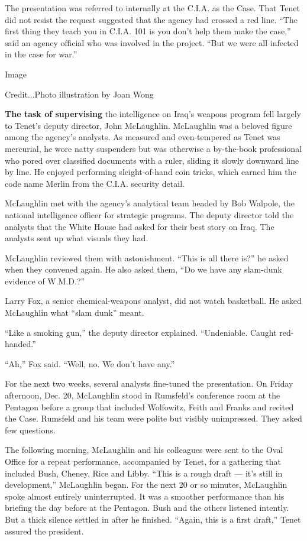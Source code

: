 The presentation was referred to internally at the C.I.A. as the Case.
That Tenet did not resist the request suggested that the agency had
crossed a red line. ``The first thing they teach you in C.I.A. 101 is
you don't help them make the case,'' said an agency official who was
involved in the project. ``But we were all infected in the case for
war.''

Image

Credit...Photo illustration by Joan Wong

\textbf{The task of supervising} the intelligence on Iraq's weapons
program fell largely to Tenet's deputy director, John McLaughlin.
McLaughlin was a beloved figure among the agency's analysts. As measured
and even-tempered as Tenet was mercurial, he wore natty suspenders but
was otherwise a by-the-book professional who pored over classified
documents with a ruler, sliding it slowly downward line by line. He
enjoyed performing sleight-of-hand coin tricks, which earned him the
code name Merlin from the C.I.A. security detail.

McLaughlin met with the agency's analytical team headed by Bob Walpole,
the national intelligence officer for strategic programs. The deputy
director told the analysts that the White House had asked for their best
story on Iraq. The analysts sent up what visuals they had.

McLaughlin reviewed them with astonishment. ``This is all there is?'' he
asked when they convened again. He also asked them, ``Do we have any
slam-dunk evidence of W.M.D.?''

Larry Fox, a senior chemical-weapons analyst, did not watch basketball.
He asked McLaughlin what ``slam dunk'' meant.

``Like a smoking gun,'' the deputy director explained. ``Undeniable.
Caught red-handed.''

``Ah,'' Fox said. ``Well, no. We don't have any.''

For the next two weeks, several analysts fine-tuned the presentation. On
Friday afternoon, Dec. 20, McLaughlin stood in Rumsfeld's conference
room at the Pentagon before a group that included Wolfowitz, Feith and
Franks and recited the Case. Rumsfeld and his team were polite but
visibly unimpressed. They asked few questions.

The following morning, McLaughlin and his colleagues were sent to the
Oval Office for a repeat performance, accompanied by Tenet, for a
gathering that included Bush, Cheney, Rice and Libby. ``This is a rough
draft --- it's still in development,'' McLaughlin began. For the next 20
or so minutes, McLaughlin spoke almost entirely uninterrupted. It was a
smoother performance than his briefing the day before at the Pentagon.
Bush and the others listened intently. But a thick silence settled in
after he finished. ``Again, this is a first draft,'' Tenet assured the
president.

